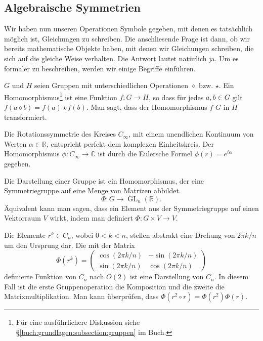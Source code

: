 \subsection{Algebraische Symmetrien}
Wir haben nun unseren Operationen Symbole gegeben, mit denen es tatsächlich möglich ist, Gleichungen zu schreiben.
Die anschliesende Frage ist dann, ob wir bereits mathematische Objekte haben, mit denen wir Gleichungen schreiben, die sich auf die gleiche Weise verhalten.
Die Antwort lautet natürlich ja.
Um es formaler zu beschreiben, werden wir einige Begriffe einführen.
\begin{definition}[Gruppenhomomorphismus]
  \(G\) und \(H\) seien  Gruppen mit unterschiedlichen Operationen \(\diamond\) bzw.
  \(\star\).
  Ein Homomorphismus\footnote{ Für eine ausführlichere Diskussion siehe \S\ref{buch:grundlagen:subsection:gruppen} im Buch.} ist eine Funktion \(f: G \to H\), so dass für jedes \(a, b \in G\) gilt \(f(a\diamond b) = f(a) \star f(b)\).
  Man sagt, dass der Homomorphismus \(f\) \(G\) in \(H\) transformiert.
\end{definition}
\begin{beispiel}
  Die Rotationssymmetrie des Kreises \(C_\infty\), mit einem unendlichen Kontinuum von Werten \(\alpha \in \mathbb{R}\), entspricht perfekt dem komplexen Einheitskreis.
  Der Homomorphismus \(\phi: C_\infty \to \mathbb{C}\) ist durch die Eulersche Formel \(\phi(r) = e^{i\alpha}\) gegeben.
\end{beispiel}

\begin{definition}
  Die Darstellung einer Gruppe ist ein Homomorphismus, der eine Symmetriegruppe auf eine Menge von Matrizen abbildet.
  \[
    \Phi: G \to \operatorname{GL}_n(\mathbb{R}).
  \]
  Äquivalent kann man sagen, dass ein Element aus der Symmetriegruppe auf einen Vektorraum \(V\) wirkt, indem man definiert \(\Phi : G \times V \to V\).
\end{definition}
\begin{beispiel}
  Die Elemente \(r^k \in C_n\), wobei \(0 < k < n\), stellen abstrakt eine Drehung von \(2\pi k/n\) um den Ursprung dar.
  Die mit der Matrix 
  \[
    \Phi(r^k) = \begin{pmatrix}
      \cos(2\pi k/n) & -\sin(2\pi k/n) \\
      \sin(2\pi k/n) &  \cos(2\pi k/n)
    \end{pmatrix}
  \]
  definierte Funktion von \(C_n\) nach \(O(2)\) ist eine Darstellung von \(C_n\).
  In diesem Fall ist die erste Gruppenoperation die Komposition und die zweite die Matrixmultiplikation.
  Man kann überprüfen, dass \(\Phi(r^2 \circ r) = \Phi(r^2)\Phi(r)\).
\end{beispiel}
